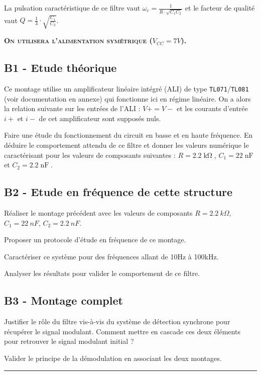 \documentclass[a4paper,11pt]{article}
\begin{document}
La pulsation caractéristique de ce filtre vaut $\omega_c = \frac{1}{R \cdot \sqrt{C_1 C_2}}$ et le facteur de qualité vaut $Q = \frac{1}{3} \cdot \sqrt{\frac{C_1}{C_2}}$.


\textbf{\textsc{On utilisera l'alimentation symétrique ($V_{CC} = 7V$).}}	



\subsection*{B1 - Etude théorique}

Ce montage utilise un amplificateur linéaire intégré (ALI) de type \texttt{TL071}/\texttt{TL081} (voir documentation en annexe) qui fonctionne ici en régime linéaire. On a alors la relation suivante sur les entrées de l'ALI : $V+ = V-$ et les courants d'entrée $i+$ et $i-$ de cet amplificateur sont supposés nuls.

\Real Faire une étude du fonctionnement du circuit en basse et en haute fréquence. En déduire le comportement attendu de ce filtre et donner les valeurs numérique le caractérisant pour les valeurs de composants
suivantes : $R = 2.2\operatorname{k\Omega}$, $C_1 = 22\operatorname{nF}$ et $C_2 = 2.2\operatorname{nF}$.

\subsection*{B2 - Etude en fréquence de cette structure}

\Real Réaliser le montage précédent avec les valeurs de composants $R = 2.2~k\Omega$, $C_1 = 22~nF$, $C_2 = 2.2~nF$. 

\Real Proposer un protocole d'étude en fréquence de ce montage.

\Real Caractériser ce système pour des fréquences allant de 10Hz à 100kHz.

\Real Analyser les résultats pour valider le comportement de ce filtre.


\subsection*{B3 - Montage complet}

\Real Justifier le rôle du filtre vis-à-vis du système de détection synchrone pour récupérer le signal modulant. Comment mettre en cascade ces deux éléments pour retrouver le signal modulant initial ?

\Real Valider le principe de la démodulation en associant les deux montages.




\noindent \rule{\linewidth}{1pt}
\end{document}
